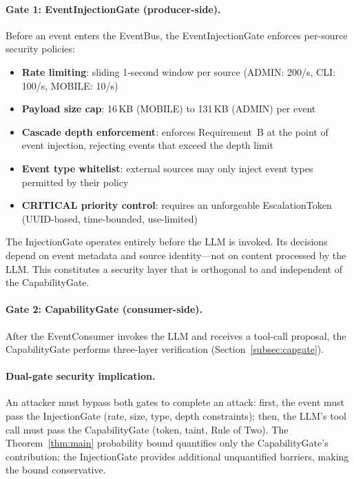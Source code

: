 \documentclass[pdflatex,sn-nature]{sn-jnl}%
\theoremstyle{thmstyleone}%
\theoremstyle{thmstyletwo}%
\theoremstyle{thmstylethree}%
\begin{document}
\paragraph{Gate 1: EventInjectionGate (producer-side).} Before an event enters the EventBus, the EventInjectionGate enforces per-source security policies:
\begin{itemize}
  \item \textbf{Rate limiting}: sliding 1-second window per source (ADMIN: 200/s, CLI: 100/s, MOBILE: 10/s)
  \item \textbf{Payload size cap}: 16\,KB (MOBILE) to 131\,KB (ADMIN) per event
  \item \textbf{Cascade depth enforcement}: enforces Requirement~B at the point of event injection, rejecting events that exceed the depth limit
  \item \textbf{Event type whitelist}: external sources may only inject event types permitted by their policy
  \item \textbf{CRITICAL priority control}: requires an unforgeable EscalationToken (UUID-based, time-bounded, use-limited)
\end{itemize}

The InjectionGate operates entirely before the LLM is invoked. Its decisions depend on event metadata and source identity---not on content processed by the LLM. This constitutes a security layer that is orthogonal to and independent of the CapabilityGate.

\paragraph{Gate 2: CapabilityGate (consumer-side).} After the EventConsumer invokes the LLM and receives a tool-call proposal, the CapabilityGate performs three-layer verification (Section~\ref{subsec:capgate}).

\paragraph{Dual-gate security implication.} An attacker must bypass both gates to complete an attack: first, the event must pass the InjectionGate (rate, size, type, depth constraints); then, the LLM's tool call must pass the CapabilityGate (token, taint, Rule of Two). The Theorem~\ref{thm:main} probability bound quantifies only the CapabilityGate's contribution; the InjectionGate provides additional unquantified barriers, making the bound conservative.
\end{document}
